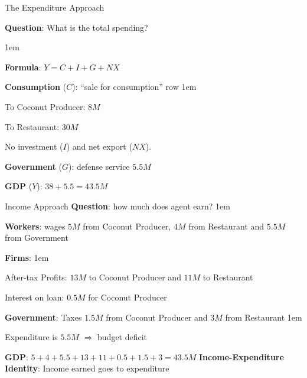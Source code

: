 \documentclass[11pt,aspectratio=43]{beamer}
\let\olditemize=\itemize
\let\endolditemize=\enditemize
\renewenvironment{itemize}{\olditemize \itemsep1em}{\endolditemize}
\theoremstyle{definition}
\begin{document}
\begin{frame}{The Expenditure Approach}
\label{slide:The_Expenditure_Approach}

\textbf{Question}: \alert{What is the total spending?}

\begin{itemize}
    \item \textbf{Formula}: $ Y = C + I + G + NX $
    \item \textbf{Consumption} ($C$): ``sale for consumption'' row
    \begin{itemize}
        \item To Coconut Producer: $ 8M $
        \item To Restaurant: $ 30M $
    \end{itemize}
    \item No investment ($ I $) and net export ($ NX $).
    \item \textbf{Government} ($G$): defense service $ 5.5M $
    \item \textbf{GDP} ($Y$): $ 38 + 5.5 = 43.5M $
\end{itemize}
\end{frame}

\begin{frame}{Income Approach}
\label{slide:Income_Approach}
    \textbf{Question}: \alert{how much does agent earn?}
    \begin{itemize}
        \item \textbf{Workers}: wages $ 5M $ from Coconut Producer, $ 4M $ from Restaurant and $ 5.5M $ from Government
        \item \textbf{Firms}:
        \begin{itemize}
            \item After-tax Profits: $ 13M $ to Coconut Producer and $ 11M $ to Restaurant
            \item Interest on loan: $ 0.5M $ for Coconut Producer
        \end{itemize}
        \item \textbf{Government}: Taxes $ 1.5M $ from Coconut Producer and $ 3M $ from Restaurant
        \begin{itemize}
            \item Expenditure is $ 5.5M $ $ \Rightarrow  $ \alert{budget deficit}
        \end{itemize}
        \item \textbf{GDP}: $5 + 4 + 5.5 + 13 + 11 + 0.5 + 1.5 + 3 = 43.5M$
    \end{itemize}
    \textbf{Income-Expenditure Identity}: Income earned goes to expenditure
\end{frame}
\end{document}
